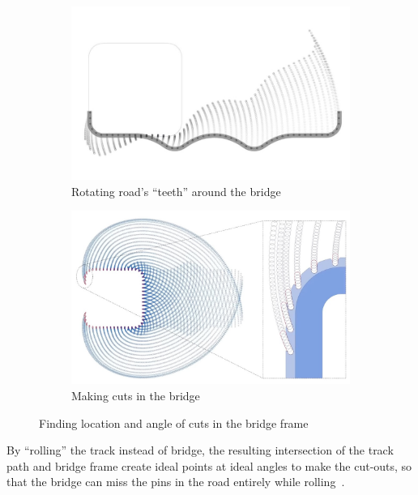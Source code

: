 \documentclass[12pt]{article}
\begin{document}
        \begin{figure}[H]
            \centering
            \begin{subfigure}{0.49\textwidth}
            \centering
            \includegraphics[width = \textwidth]{images/bridge_teeth_1.jpg}
            \caption{Rotating road's ``teeth'' around the bridge}\label{fig:teeth1}
            \end{subfigure}
            \begin{subfigure}{0.49\textwidth}
            \centering
            \includegraphics[width = \textwidth]{images/bridge_teeth_2.jpg}
            \caption{Making cuts in the bridge}\label{fig:teeth2}
            \end{subfigure}

            \caption{Finding location and angle of cuts in the bridge frame~\cite{parker.2023}}
        \end{figure}
     
        By ``rolling'' the track instead of bridge, the resulting intersection of the track path and bridge frame create ideal points at ideal angles to make the cut-outs, so that the bridge can miss the pins in the road entirely while rolling~\cite{parker.2023}.
        
\end{document}
